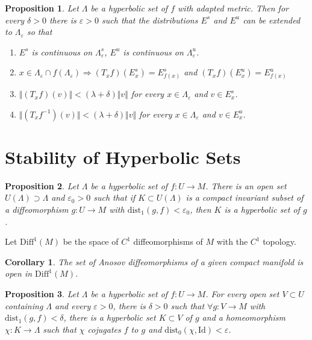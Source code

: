 \documentclass{article}
\newtheorem{prop}{Proposition}
\newtheorem{cor}{Corollary}
\begin{document}
\begin{prop}

Let $\Lambda$ be a hyperbolic set of $f$ with adapted metric. Then for every $\delta > 0$ there is $\varepsilon > 0$ such that the distributions $E^s$ and $E^u$ can be extended to $\Lambda_{\varepsilon}$ so that 
\begin{enumerate}
    \item $E^s$ is continuous on $\Lambda^s_{\varepsilon}$, $E^u$ is continuous on $\Lambda^u_{\varepsilon}$.
    \item $x \in \Lambda_{\varepsilon} \cap f(\Lambda_{\varepsilon}) \Rightarrow (T_xf)(E^s_x)=E^s_{f(x)}$ and $(T_xf)(E^u_x) = E^u_{f(x)}$
    \item $\Vert (T_xf)(v) \Vert < (\lambda + \delta) \Vert v \Vert $ for every $x \in \Lambda_{\varepsilon}$ and $v \in E^s_x$.
    \item $\Vert (T_xf^{-1})(v) \Vert < (\lambda + \delta) \Vert v \Vert$ for every $x \in \Lambda_{\varepsilon}$ and $v \in E^u_x$.
\end{enumerate}

\end{prop}

\section{Stability of Hyperbolic Sets}

\begin{prop}

Let $\Lambda$ be a hyperbolic set of $f: U \to M$. There is an open set $U(\Lambda) \supset \Lambda$ and $\varepsilon_0 > 0$ such that if $K \subset U(\Lambda)$ is a compact invariant subset of a diffeomorphism $g:U \to M$ with $\mathrm{dist}_1(g,f) < \varepsilon_0$, then $K$ is a hyperbolic set of $g$.

\end{prop}

Let $\mathrm{Diff}^1(M)$ be the space of $C^1$ diffeomorphisms of $M$ with the $C^1$ topology.

\begin{cor}

The set of Anosov diffeomorphisms of a given compact manifold is open in $\mathrm{Diff}^1(M)$.

\end{cor}

\begin{prop}

Let $\Lambda$ be a hyperbolic set of $f:U \to M$. For every open set $V \subset U$ containing $\Lambda$ and every $\varepsilon > 0$, there is $\delta > 0$ such that $\forall g: V \to M$ with $\mathrm{dist}_1(g,f) < \delta$, there is a hyperbolic set $K \subset V$ of $g$ and a homeomorphism $\chi: K \to \Lambda$ such that $\chi$ cojugates $f$ to $g$ and $\mathrm{dist}_0(\chi, \mathrm{Id}) < \varepsilon$.
\end{prop}
\end{document}
